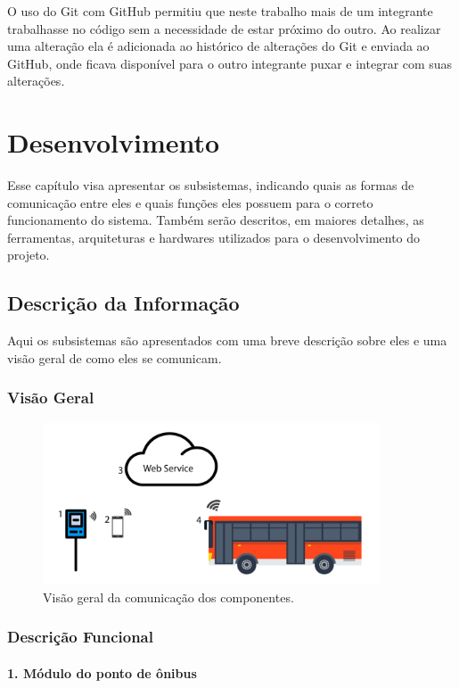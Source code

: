 \documentclass[
	12pt,				%
	oneside,			%
	a4paper,			%
	brazil				%
]{abntex2}
\begin{document}
O uso do Git com GitHub permitiu que neste trabalho mais de um integrante trabalhasse no código sem a necessidade de estar próximo do outro. Ao realizar uma alteração ela é adicionada ao histórico de alterações do Git e enviada ao GitHub, onde ficava disponível para o outro integrante puxar e integrar com suas alterações.


\chapter{Desenvolvimento}

Esse capítulo visa apresentar os subsistemas, indicando quais as formas de comunicação entre eles e quais funções eles possuem para o correto funcionamento do sistema. Também serão descritos, em maiores detalhes, as ferramentas, arquiteturas e hardwares utilizados para o desenvolvimento do projeto.

\section{Descrição da Informação}

Aqui os subsistemas são apresentados com uma breve descrição sobre eles e uma visão geral de como eles se comunicam.

\subsection{Visão Geral}

\begin{figure}[!h]
\centering
\includegraphics[width=10cm, center]{images/relations_system.jpg}
\caption{Visão geral da comunicação dos componentes.}
\label{Rotulo}
\end{figure}

\subsection{Descrição Funcional}

\subsubsection*{1. Módulo do ponto de ônibus}
\end{document}
